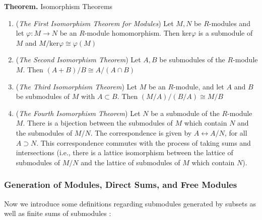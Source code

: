 \documentclass[11pt, reqno]{amsart}
\theoremstyle{plain}
\theoremstyle{definition}
\theoremstyle{example}
\begin{document}
\par
\textbf{Theorem.} Isomorphism Theorems
\begin{enumerate}
\item (\textit{The First Isomorphism Theorem for Modules}) Let $M, N$ be $R$-modules and let $\varphi: M \to N$ be an $R$-module homomorphism. Then ker$\varphi$ is a submodule of $M$ and $M/\text{ker}\varphi \cong \varphi(M)$
\item (\textit{The Second Isomorphism Theorem}) Let $A, B$ be submodules of the $R$-module $M$. Then $(A+B)/B \cong A/(A \cap B)$
\item (\textit{The Third Isomorphism Theorem}) Let $M$ be an $R$-module, and let $A$ and $B$ be submodules of $M$ with $A \subset B$. Then $(M/A)/(B/A) \cong M/B$
\item (\textit{The Fourth Isomorphism Theorem}) Let $N$ be a submodule of the $R$-module $M$. There is a bijection between the submodules of $M$ which contain $N$ and the submodules of $M/N$. The correspondence is given by $A \longleftrightarrow A/N$, for all $A \supset N$. This correspondence commutes with the process of taking sums and intersections (i.e., there is a lattice isomorphism between the lattice of submodules of $M/N$ and the lattice of submodules of $M$ which contain $N$).
\end{enumerate}

\subsubsection{Generation of Modules, Direct Sums, and Free Modules}

Now we introduce some definitions regarding submodules generated by subsets as well as finite sums of submodules \cite[\S 10.3, p. 351]{dummit}:
\end{document}

